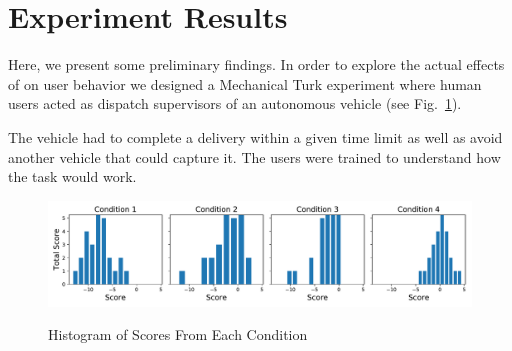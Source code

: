 \section{Experiment Results} \label{sec:exp_results}
Here, we present some preliminary findings. In order to explore the actual effects of \famsec on user behavior we designed a Mechanical Turk experiment where human users acted as dispatch supervisors of an autonomous vehicle (see Fig.~\ref{fig:experiment}). 

The vehicle had to complete a delivery within a given time limit as well as avoid another vehicle that could capture it. The users were trained to understand how the task would work.

\begin{figure}[tbp]
    \centering
    \includegraphics[width=1.0\linewidth]{Figures/test.pdf}
    \label{fig:experiment}
    \caption{Histogram of Scores From Each Condition}
\end{figure}
%
